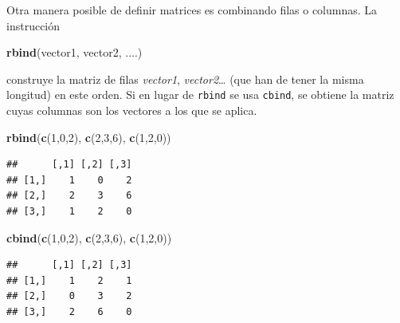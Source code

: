 \documentclass[]{book}
\newenvironment{Shaded}{\begin{snugshade}}{\end{snugshade}}
\newcommand{\DecValTok}[1]{\textcolor[rgb]{0.00,0.00,0.81}{#1}}
\newcommand{\KeywordTok}[1]{\textcolor[rgb]{0.13,0.29,0.53}{\textbf{#1}}}
\newcommand{\NormalTok}[1]{#1}
\theoremstyle{definition}
\theoremstyle{definition}
\theoremstyle{definition}
\theoremstyle{remark}
\begin{document}
Otra manera posible de definir matrices es combinando filas o columnas. La instrucción

\begin{Shaded}
\begin{Highlighting}[]
\KeywordTok{rbind}\NormalTok{(vector1, vector2, ....)}
\end{Highlighting}
\end{Shaded}

construye la matriz de filas \emph{vector1}, \emph{vector2}\ldots{} (que han de tener la misma longitud) en este orden. Si en lugar de \texttt{rbind} se usa \texttt{cbind}, se obtiene la matriz cuyas columnas son los vectores a los que se aplica.

\begin{Shaded}
\begin{Highlighting}[]
\KeywordTok{rbind}\NormalTok{(}\KeywordTok{c}\NormalTok{(}\DecValTok{1}\NormalTok{,}\DecValTok{0}\NormalTok{,}\DecValTok{2}\NormalTok{), }\KeywordTok{c}\NormalTok{(}\DecValTok{2}\NormalTok{,}\DecValTok{3}\NormalTok{,}\DecValTok{6}\NormalTok{), }\KeywordTok{c}\NormalTok{(}\DecValTok{1}\NormalTok{,}\DecValTok{2}\NormalTok{,}\DecValTok{0}\NormalTok{))}
\end{Highlighting}
\end{Shaded}

\begin{verbatim}
##      [,1] [,2] [,3]
## [1,]    1    0    2
## [2,]    2    3    6
## [3,]    1    2    0
\end{verbatim}

\begin{Shaded}
\begin{Highlighting}[]
\KeywordTok{cbind}\NormalTok{(}\KeywordTok{c}\NormalTok{(}\DecValTok{1}\NormalTok{,}\DecValTok{0}\NormalTok{,}\DecValTok{2}\NormalTok{), }\KeywordTok{c}\NormalTok{(}\DecValTok{2}\NormalTok{,}\DecValTok{3}\NormalTok{,}\DecValTok{6}\NormalTok{), }\KeywordTok{c}\NormalTok{(}\DecValTok{1}\NormalTok{,}\DecValTok{2}\NormalTok{,}\DecValTok{0}\NormalTok{))}
\end{Highlighting}
\end{Shaded}

\begin{verbatim}
##      [,1] [,2] [,3]
## [1,]    1    2    1
## [2,]    0    3    2
## [3,]    2    6    0
\end{verbatim}
\end{document}
